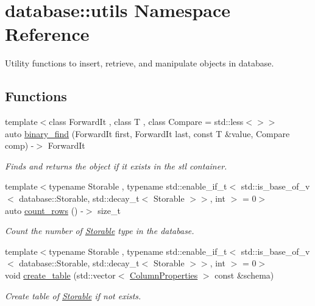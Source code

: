 \hypertarget{namespacedatabase_1_1utils}{}\section{database\+:\+:utils Namespace Reference}
\label{namespacedatabase_1_1utils}


Utility functions to insert, retrieve, and manipulate objects in database.  


\subsection*{Functions}
\begin{DoxyCompactItemize}
\item 
{\footnotesize template$<$class Forward\+It , class T , class Compare  = std\+::less$<$$>$$>$ }\\auto \hyperlink{namespacedatabase_1_1utils_a0dd569af49c9913a5090b71c86690fe5}{binary\+\_\+find} (Forward\+It first, Forward\+It last, const T \&value, Compare comp) -\/$>$ Forward\+It
\begin{DoxyCompactList}\small\item\em Finds and returns the object if it exists in the stl container. \end{DoxyCompactList}\item 
{\footnotesize template$<$typename Storable , typename std\+::enable\+\_\+if\+\_\+t$<$ std\+::is\+\_\+base\+\_\+of\+\_\+v$<$ database\+::\+Storable, std\+::decay\+\_\+t$<$ Storable $>$$>$, int $>$  = 0$>$ }\\auto \hyperlink{namespacedatabase_1_1utils_adae24cb18f62390528243ff3218d8626}{count\+\_\+rows} () -\/$>$ size\+\_\+t
\begin{DoxyCompactList}\small\item\em Count the number of \hyperlink{classdatabase_1_1_storable}{Storable} type in the database. \end{DoxyCompactList}\item 
{\footnotesize template$<$typename Storable , typename std\+::enable\+\_\+if\+\_\+t$<$ std\+::is\+\_\+base\+\_\+of\+\_\+v$<$ database\+::\+Storable, std\+::decay\+\_\+t$<$ Storable $>$$>$, int $>$  = 0$>$ }\\void \hyperlink{namespacedatabase_1_1utils_a303b59245b11befd59f3fd0e838ef80b}{create\+\_\+table} (std\+::vector$<$ \hyperlink{structdatabase_1_1_column_properties}{Column\+Properties} $>$ const \&schema)
\begin{DoxyCompactList}\small\item\em Create table of \hyperlink{classdatabase_1_1_storable}{Storable} if not exists. \end{DoxyCompactList}\item 

\end{DoxyCompactItemize}
